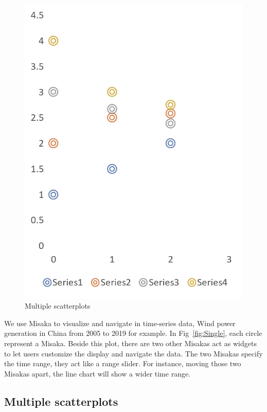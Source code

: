 \documentclass[conference]{IEEEtran}
\begin{document}
\begin{figure}
\begin{minipage}{0.49\columnwidth}
      \includegraphics[width=0.99\columnwidth]{scatterplots01.png}
      \caption{Multiple scatterplots}
      \label{fig:Multiple}
    \end{minipage}
\end{figure}

We use Misaka to visualize and navigate in time-series data, Wind power generation in China from 2005 to 2019 for example. In Fig~\ref{fig:Single}, each circle represent a Misaka. Beside this plot, there are two other Misakas act as widgets to let users customize the display and navigate the data. The two Misakas specify the time range, they act like a range slider\cite{ahlberg1992dynamic}. For instance, moving those two Misakas apart, the line chart will show a wider time range.


\subsection{Multiple scatterplots}
\end{document}
